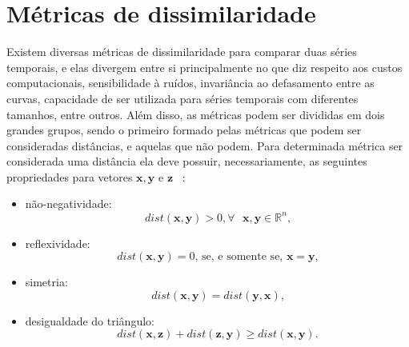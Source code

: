 


\section{Métricas de dissimilaridade} \label{sec:metricas}

Existem diversas métricas de dissimilaridade para comparar duas séries temporais, e elas divergem entre si principalmente no que diz respeito aos custos computacionais, sensibilidade à ruídos, invariância ao defasamento entre as curvas, capacidade de ser utilizada para séries temporais com diferentes tamanhos, entre outros. Além disso, as métricas podem ser divididas em dois grandes grupos, sendo o primeiro formado pelas métricas que podem ser consideradas distâncias, e aquelas que não podem. Para determinada métrica ser considerada uma distância ela deve possuir, necessariamente, as seguintes propriedades para vetores $\bm{x},\bm{y}$ e $\bm{z}$ ~\parencite{DudaHart}:


\begin{itemize}
	\item não-negatividade:
	\begin{equation}
	dist(\bm{x},\bm{y}) > 0, \forall \text{ }  \bm{x},\bm{y} \in \mathbb{R}^{n}\text{,}
	\end{equation}
	\item reflexividade:
	\begin{equation}
	dist(\bm{x},\bm{y}) = 0\text{, se, e somente se, }\bm{x}=\bm{y}\text{,}
	\end{equation}
	\item simetria:
	\begin{equation}
	dist(\bm{x},\bm{y}) = dist(\bm{y},\bm{x})\text{,}
	\end{equation}
	\item desigualdade do triângulo:
	\begin{equation}
	dist(\bm{x},\bm{z}) + dist(\bm{z},\bm{y}) \geq dist(\bm{x},\bm{y}).
	\end{equation}
\end{itemize}


